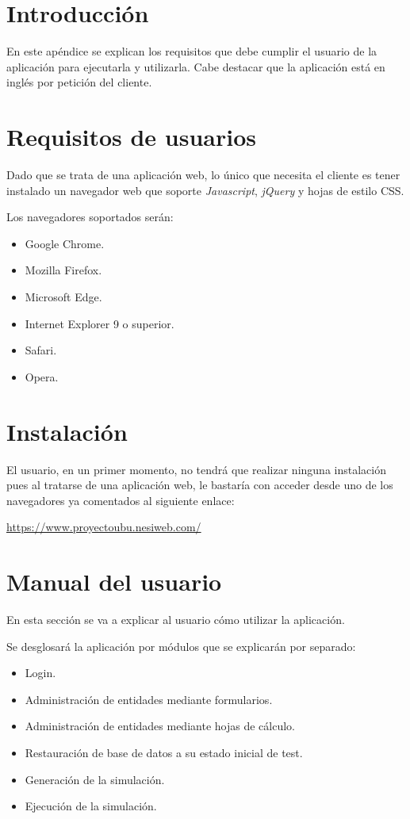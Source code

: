 
\section{Introducción}

En este apéndice se explican los requisitos que debe cumplir el usuario de la aplicación para ejecutarla y utilizarla. Cabe destacar que la aplicación está en inglés por petición del cliente.

\section{Requisitos de usuarios}

Dado que se trata de una aplicación web, lo único que necesita el cliente es tener instalado un navegador web que soporte \textit{Javascript}, \textit{jQuery} y hojas de estilo CSS.

Los navegadores soportados serán:
\begin{itemize}
	\item Google Chrome.
	\item Mozilla Firefox.
	\item Microsoft Edge.
	\item Internet Explorer 9 o superior.
	\item Safari.
	\item Opera.
\end{itemize}

\section{Instalación}

El usuario, en un primer momento, no tendrá que realizar ninguna instalación pues al tratarse de una aplicación web, le bastaría con acceder desde uno de los navegadores ya comentados al siguiente enlace: 

\url{https://www.proyectoubu.nesiweb.com/}

\section{Manual del usuario}

En esta sección se va a explicar al usuario cómo utilizar la aplicación.

Se desglosará la aplicación por módulos que se explicarán por separado:
\begin{itemize}
	\item Login.
	\item Administración de entidades mediante formularios.
	\item Administración de entidades mediante hojas de cálculo.
	\item Restauración de base de datos a su estado inicial de test.
	\item Generación de la simulación.
	\item Ejecución de la simulación.
	
\end{itemize}

